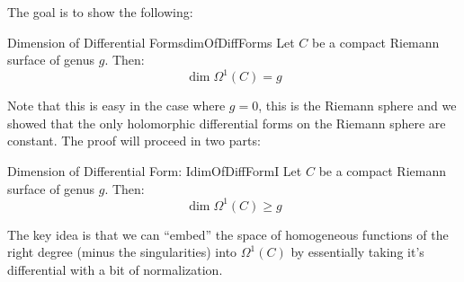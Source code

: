 \documentclass{book}
\begin{document}
The goal is to show the following:

\begin{thm}{Dimension of Differential Forms}{dimOfDiffForms}
  Let $C$ be a compact Riemann surface of genus $g$. Then:
  \[
    \dim \Omega^1(C) = g
  \]
\end{thm}

Note that this is easy in the case where $g = 0$, this is the Riemann sphere and we showed that the only
holomorphic differential forms on the Riemann sphere are constant. The proof will proceed in two parts:

\begin{prop}{Dimension of Differential Form: I}{dimOfDiffFormI}
  Let $C$ be a compact Riemann surface of genus $g$. Then:
  \[
    \dim \Omega^1(C) \ge g
  \]
\end{prop}

The key idea is that we can ``embed'' the space of homogeneous functions of the right degree (minus the
singularities) into $\Omega^1(C)$ by essentially taking it's differential with a bit of normalization.
\end{document}
